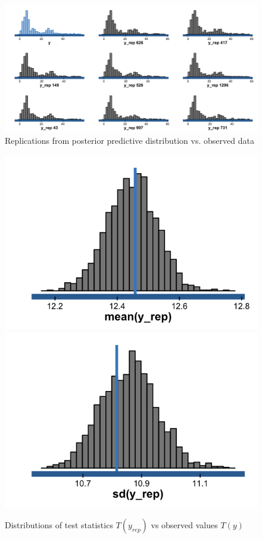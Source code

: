 \begin{figure}
\centering
	\includegraphics[scale=0.25]{sections/figs/ck_pp_hists}
\caption{Replications from posterior predictive distribution vs. observed data}
\label{fig:ck_pp_hists}
\end{figure}

\begin{figure}
\centering
	\includegraphics[scale=0.25]{sections/figs/ck_pp_test_statistics_mean}
	\includegraphics[scale=0.25]{sections/figs/ck_pp_test_statistics_sd}
\caption{Distributions of test statistics $T(y_{rep})$ vs observed values $T(y)$}
\label{fig:ck_pp_test_statistics}
\end{figure}

